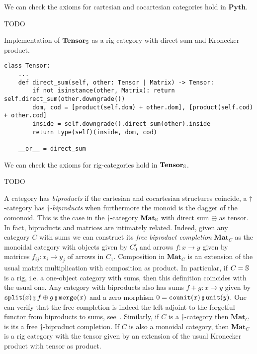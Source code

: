 \begin{example}
We can check the axioms for cartesian and cocartesian categories hold in $\mathbf{Pyth}$.

TODO
\end{example}

\begin{python}
{\normalfont Implementation of $\mathbf{Tensor}_\S$ as a rig category with direct sum and Kronecker product.}

\begin{verbatim}
class Tensor:
    ...
    def direct_sum(self, other: Tensor | Matrix) -> Tensor:
        if not isinstance(other, Matrix): return self.direct_sum(other.downgrade())
        dom, cod = [product(self.dom) + other.dom], [product(self.cod) + other.cod]
        inside = self.downgrade().direct_sum(other).inside
        return type(self)(inside, dom, cod)

    __or__ = direct_sum
\end{verbatim}
\end{python}

\begin{example}
We can check the axioms for rig-categories hold in $\mathbf{Tensor}_\S$.

TODO
\end{example}

A category has \emph{biproducts} if the cartesian and cocartesian structures coincide,
a $\dagger$-category has \emph{$\dagger$-biproducts} when furthermore the monoid is the dagger of the comonoid.
This is the case in the $\dagger$-category $\mathbf{Mat}_\S$ with direct sum $\oplus$ as tensor.
In fact, biproducts and matrices are intimately related.
Indeed, given any category $C$ with sums we can construct its \emph{free biproduct completion} $\mathbf{Mat}_C$ as the monoidal category with objects given by $C_0^\star$ and arrows $f : x \to y$ given by matrices $f_{ij} : x_i \to y_j$ of arrows in $C_1$.
Composition in $\mathbf{Mat}_C$ is an extension of the usual matrix multiplication with composition as product.
In particular, if $C = \S$ is a rig, i.e. a one-object category with sums, then this definition coincides with the usual one.
Any category with biproducts also has sums $f + g : x \to y$ given by $\ttsplit(x) \fcmp f \oplus g \fcmp \merge(x)$ and a zero morphism $0 = \counit(x) \fcmp \unit(y)$.
One can verify that the free completion is indeed the left-adjoint to the forgetful functor from biproducts to sums, see~\cite[Exercise VIII.2.6]{MacLane71}.
Similarly, if $C$ is a $\dagger$-category then $\mathbf{Mat}_C$ is its a free $\dagger$-biproduct completion.
If $C$ is also a monoidal category, then $\mathbf{Mat}_C$ is a rig category with the tensor given by an extension of the usual Kronecker product with tensor as product.

